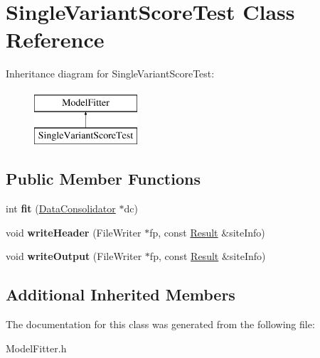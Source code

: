 \hypertarget{classSingleVariantScoreTest}{\section{Single\-Variant\-Score\-Test Class Reference}
\label{classSingleVariantScoreTest}
}
Inheritance diagram for Single\-Variant\-Score\-Test\-:\begin{figure}[H]
\begin{center}
\leavevmode
\includegraphics[height=2.000000cm]{classSingleVariantScoreTest}
\end{center}
\end{figure}
\subsection*{Public Member Functions}
\begin{DoxyCompactItemize}
\item 
\hypertarget{classSingleVariantScoreTest_aba86a76f5311030a97493a6ebcb83697}{int {\bfseries fit} (\hyperlink{classDataConsolidator}{Data\-Consolidator} $\ast$dc)}\label{classSingleVariantScoreTest_aba86a76f5311030a97493a6ebcb83697}

\item 
\hypertarget{classSingleVariantScoreTest_a11c16becc464c6796b3b898004bd8d5f}{void {\bfseries write\-Header} (File\-Writer $\ast$fp, const \hyperlink{classResult}{Result} \&site\-Info)}\label{classSingleVariantScoreTest_a11c16becc464c6796b3b898004bd8d5f}

\item 
\hypertarget{classSingleVariantScoreTest_a628b4a6c5c00841df6658bc0e48f87ee}{void {\bfseries write\-Output} (File\-Writer $\ast$fp, const \hyperlink{classResult}{Result} \&site\-Info)}\label{classSingleVariantScoreTest_a628b4a6c5c00841df6658bc0e48f87ee}

\end{DoxyCompactItemize}
\subsection*{Additional Inherited Members}


The documentation for this class was generated from the following file\-:\begin{DoxyCompactItemize}
\item 
Model\-Fitter.\-h\end{DoxyCompactItemize}
